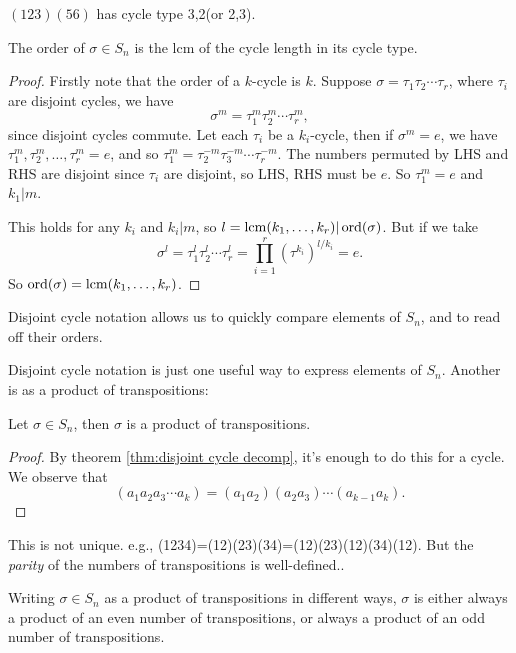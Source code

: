 \documentclass[a4paper]{article}
\begin{document}
    \begin{example}
        $ (123)(56) $ has cycle type 3,2(or 2,3).
    \end{example}
    \begin{theorem}\label{thm:lcm of cycle type is order}
        The order of $ \sigma\in S_n $ is the lcm of the cycle length in its cycle type.
    \end{theorem}
    \begin{proof}
        Firstly note that the order of a $k$-cycle is $k$. Suppose $ \sigma= \tau_1 \tau_2\cdots \tau_r $, where $ \tau_i $ are disjoint cycles, we have 
        \[
            \sigma^m = \tau^m_1 \tau^m_2\cdots \tau^m_r
        ,\]
        since disjoint cycles commute. Let each $ \tau_i $ be a $k_i$-cycle, then if $ \sigma^m=e $, we have $ \tau^m_1,\tau^m_2,\dots,\tau^m_r=e $, and so $ \tau_1^m=\tau_2^{-m}\tau_{3}^{-m}\cdots \tau_{r}^{-m} $. The numbers permuted by LHS and RHS are disjoint since $ \tau_i $ are disjoint, so LHS, RHS must be $e$. So $ \tau_1^m=e $ and $ k_1|m$.

        This holds for any $k_i$ and $k_i|m$, so $ l=\operatorname{lcm} (k_1,\dots,k_r)| \operatorname{ord}(\sigma) $. But if we take
        \[
            \sigma^{l}=\tau^l_1 \tau^l_2\cdots \tau^l_r = \prod_{i=1}^r (\tau^{k_i})^{l/k_i}=e
        .\]
        So $ \operatorname{ord}(\sigma)=\operatorname{lcm} (k_1,\dots,k_r) $.
    \end{proof}
    \begin{remark}
        Disjoint cycle notation allows us to quickly compare elements of $S_n$, and to read off their orders.
    \end{remark}
    Disjoint cycle notation is just one useful way to express elements of $S_n$. Another is as a product of transpositions:
    \begin{proposition}\label{prop:2.16}
        Let $ \sigma\in S_n $, then $\sigma$ is a product of transpositions.
    \end{proposition}
    \begin{proof}
        By theorem \ref{thm:disjoint cycle decomp}, it's enough to do this for a cycle. We observe that 
        \[
            (a_1 a_2 a_3 \cdots a_k)=(a_1a_2)(a_2a_3)\cdots(a_{k-1}a_k)
        .\]
    \end{proof}
    \begin{remark}
        This is not unique. e.g., (1234)=(12)(23)(34)=(12)(23)(12)(34)(12). But the \textit{parity} of the numbers of transpositions is well-defined..
    \end{remark}
    \begin{theorem}\label{thm:parity_transposition}
        Writing $ \sigma\in S_n $ as a product of transpositions in different ways, $\sigma$ is either always a product of an even number of transpositions, or always a product of an odd number of transpositions.
    \end{theorem}
\end{document}
